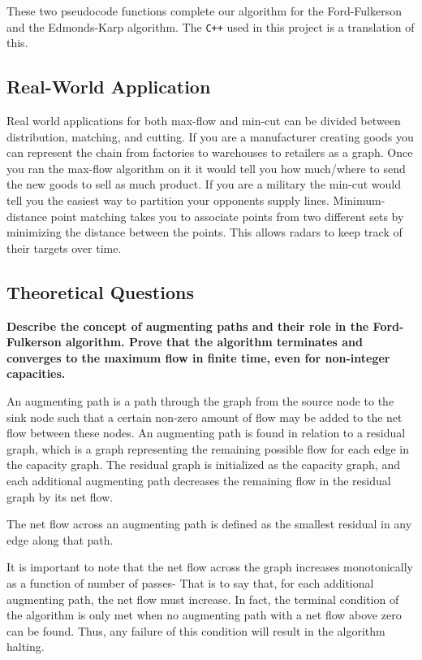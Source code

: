 \documentclass[12pt]{amsart}
\begin{document}
    These two pseudocode functions complete our algorithm for
    the Ford-Fulkerson and the Edmonds-Karp algorithm. The
    \verb|C++| used in this project is a translation of this.

\subsection{Real-World Application}

    Real world applications for both max-flow and min-cut can be
    divided between distribution, matching, and cutting. If you
    are a manufacturer creating goods you can represent the
    chain from factories to warehouses to retailers as a graph.
    Once you ran the max-flow algorithm on it it would tell you
    how much/where to send the new goods to sell as much
    product. If you are a military the min-cut would tell you
    the easiest way to partition your opponents supply lines.
    Minimum-distance point matching takes you to associate
    points from two different sets by minimizing the distance
    between the points. This allows radars to keep track of
    their targets over time.

\subsection{Theoretical Questions}

    \textbf{Describe the concept of augmenting paths and
    their role in the Ford-Fulkerson algorithm. Prove that the
    algorithm terminates and converges to the maximum flow in
    finite time, even for non-integer capacities.}

    An augmenting path is a path through the graph from the
    source node to the sink node such that a certain non-zero
    amount of flow may be added to the net flow between these
    nodes. An augmenting path is found in relation to a residual
    graph, which is a graph representing the remaining possible
    flow for each edge in the capacity graph. The residual graph
    is initialized as the capacity graph, and each additional
    augmenting path decreases the remaining flow in the residual
    graph by its net flow.

    The net flow across an augmenting path is defined as the
    smallest residual in any edge along that path.

    It is important to note that the net flow across the graph
    increases monotonically as a function of number of passes-
    That is to say that, for each additional augmenting path,
    the net flow must increase. In fact, the terminal condition
    of the algorithm is only met when no augmenting path with a
    net flow above zero can be found. Thus, any failure of this
    condition will result in the algorithm halting.
\end{document}
